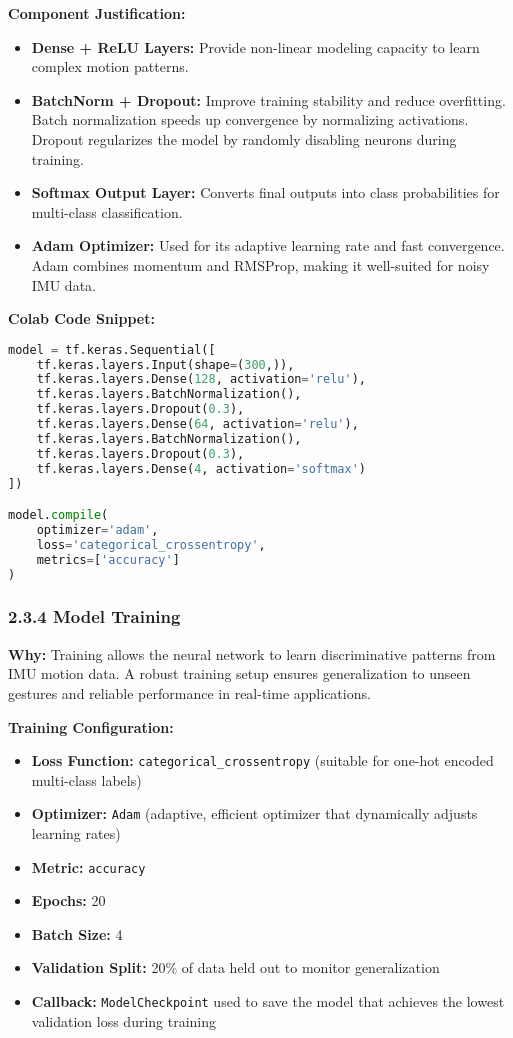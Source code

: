 \documentclass[a4paper,12pt]{article}
\begin{document}
\textbf{Component Justification:}
\begin{itemize}
    \item \textbf{Dense + ReLU Layers:} Provide non-linear modeling capacity to learn complex motion patterns.
    \item \textbf{BatchNorm + Dropout:} Improve training stability and reduce overfitting. Batch normalization speeds up convergence by normalizing activations. Dropout regularizes the model by randomly disabling neurons during training.
    \item \textbf{Softmax Output Layer:} Converts final outputs into class probabilities for multi-class classification.
    \item \textbf{Adam Optimizer:} Used for its adaptive learning rate and fast convergence. Adam combines momentum and RMSProp, making it well-suited for noisy IMU data.
\end{itemize}

\textbf{Colab Code Snippet:}
\begin{lstlisting}[language=Python]
model = tf.keras.Sequential([
    tf.keras.layers.Input(shape=(300,)),
    tf.keras.layers.Dense(128, activation='relu'),
    tf.keras.layers.BatchNormalization(),
    tf.keras.layers.Dropout(0.3),
    tf.keras.layers.Dense(64, activation='relu'),
    tf.keras.layers.BatchNormalization(),
    tf.keras.layers.Dropout(0.3),
    tf.keras.layers.Dense(4, activation='softmax')
])

model.compile(
    optimizer='adam',
    loss='categorical_crossentropy',
    metrics=['accuracy']
)
\end{lstlisting}

\subsubsection*{2.3.4 Model Training}

\textbf{Why:} Training allows the neural network to learn discriminative patterns from IMU motion data. A robust training setup ensures generalization to unseen gestures and reliable performance in real-time applications.

\textbf{Training Configuration:}
\begin{itemize}
    \item \textbf{Loss Function:} \texttt{categorical\_crossentropy} (suitable for one-hot encoded multi-class labels)
    \item \textbf{Optimizer:} \texttt{Adam} (adaptive, efficient optimizer that dynamically adjusts learning rates)
    \item \textbf{Metric:} \texttt{accuracy}
    \item \textbf{Epochs:} 20
    \item \textbf{Batch Size:} 4
    \item \textbf{Validation Split:} 20\% of data held out to monitor generalization
    \item \textbf{Callback:} \texttt{ModelCheckpoint} used to save the model that achieves the lowest validation loss during training
\end{itemize}
\end{document}
